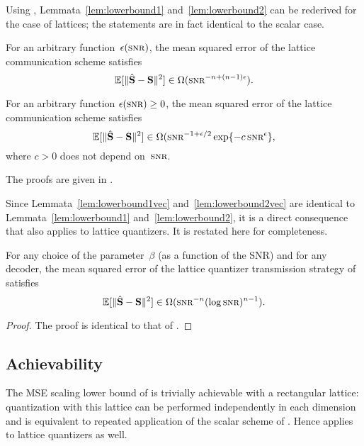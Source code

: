 Using , Lemmata~\ref{lem:lowerbound1}
and~\ref{lem:lowerbound2} can be rederived for the case of lattices; the
statements are in fact identical to the scalar case.

\begin{lemma}
  \label{lem:lowerbound1vec}
  For an arbitrary function~$\e(\snr)$, the mean squared error of the lattice
  communication scheme satisfies
  \begin{equation*}
    \msev \in \Omega(\snr^{-n + (n-1)\e}).
  \end{equation*}
\end{lemma}

\begin{lemma}
  \label{lem:lowerbound2vec}
  For an arbitrary function $\e(\snr) \ge 0$, the mean squared error of the
  lattice communication scheme satisfies
  \begin{equation*}
    \msev \in \Omega(\snr^{-1 + \e/2} \exp\{- c \snr^\e \},
  \end{equation*}
  where $c > 0$ does not depend on~$\snr$.
\end{lemma}

The proofs are given in .

Since Lemmata~\ref{lem:lowerbound1vec} and~\ref{lem:lowerbound2vec} are
identical to Lemmata~\ref{lem:lowerbound1} and~\ref{lem:lowerbound2}, it is a
direct consequence that  also applies to lattice quantizers.
It is restated here for completeness.

\begin{theorem}
  \label{thm:scalinglbvec}
  For any choice of the parameter~$\beta$ (as a function of the SNR) and for any
  decoder, the mean squared error of the lattice quantizer transmission strategy
  of  satisfies
  \begin{equation*}
    \msev \in \Omega(\snr^{-n} (\log\snr)^{n-1}).
  \end{equation*}
\end{theorem}

\begin{proof}
  The proof is identical to that of .
\end{proof}


\subsection{Achievability}

The MSE scaling lower bound of  is trivially achievable
with a rectangular lattice: quantization with this lattice can be performed
independently in each dimension and is equivalent to repeated application of the
scalar scheme of . Hence 
applies to lattice quantizers as well. 

